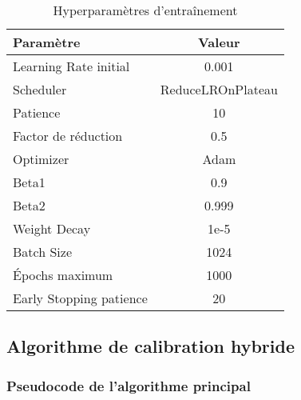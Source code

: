 \begin{table}[H]
\centering
\caption{Hyperparamètres d'entraînement}
\begin{tabular}{@{}lc@{}}
\toprule
\textbf{Paramètre} & \textbf{Valeur} \\
\midrule
Learning Rate initial & 0.001 \\
Scheduler & ReduceLROnPlateau \\
Patience & 10 \\
Factor de réduction & 0.5 \\
Optimizer & Adam \\
Beta1 & 0.9 \\
Beta2 & 0.999 \\
Weight Decay & 1e-5 \\
Batch Size & 1024 \\
Épochs maximum & 1000 \\
Early Stopping patience & 20 \\
\bottomrule
\end{tabular}
\end{table}

\subsection{Algorithme de calibration hybride}

\subsubsection{Pseudocode de l'algorithme principal}

